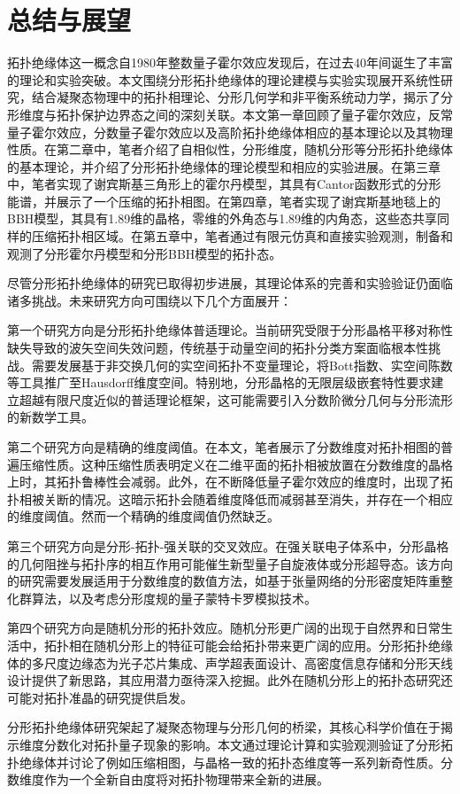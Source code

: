 \chapter{总结与展望}
拓扑绝缘体这一概念自1980年整数量子霍尔效应发现后，在过去40年间诞生了丰富的理论和实验突破。本文围绕分形拓扑绝缘体的理论建模与实验实现展开系统性研究，结合凝聚态物理中的拓扑相理论、分形几何学和非平衡系统动力学，揭示了分形维度与拓扑保护边界态之间的深刻关联。本文第一章回顾了量子霍尔效应，反常量子霍尔效应，分数量子霍尔效应以及高阶拓扑绝缘体相应的基本理论以及其物理性质。在第二章中，笔者介绍了自相似性，分形维度，随机分形等分形拓扑绝缘体的基本理论，并介绍了分形拓扑绝缘体的理论模型和相应的实验进展。在第三章中，笔者实现了谢宾斯基三角形上的霍尔丹模型，其具有Cantor函数形式的分形能谱，并展示了一个压缩的拓扑相图。在第四章，笔者实现了谢宾斯基地毯上的BBH模型，其具有1.89维的晶格，零维的外角态与1.89维的内角态，这些态共享同样的压缩拓扑相区域。在第五章中，笔者通过有限元仿真和直接实验观测，制备和观测了分形霍尔丹模型和分形BBH模型的拓扑态。

尽管分形拓扑绝缘体的研究已取得初步进展，其理论体系的完善和实验验证仍面临诸多挑战。未来研究方向可围绕以下几个方面展开：

第一个研究方向是分形拓扑绝缘体普适理论。当前研究受限于分形晶格平移对称性缺失导致的波矢空间失效问题，传统基于动量空间的拓扑分类方案面临根本性挑战。需要发展基于非交换几何的实空间拓扑不变量理论，将Bott指数、实空间陈数等工具推广至Hausdorff维度空间。特别地，分形晶格的无限层级嵌套特性要求建立超越有限尺度近似的普适理论框架，这可能需要引入分数阶微分几何与分形流形的新数学工具。

第二个研究方向是精确的维度阈值。在本文，笔者展示了分数维度对拓扑相图的普遍压缩性质。这种压缩性质表明定义在二维平面的拓扑相被放置在分数维度的晶格上时，其拓扑鲁棒性会减弱。此外，在不断降低量子霍尔效应的维度时，出现了拓扑相被关断的情况。这暗示拓扑会随着维度降低而减弱甚至消失，并存在一个相应的维度阈值。然而一个精确的维度阈值仍然缺乏。

第三个研究方向是分形-拓扑-强关联的交叉效应。在强关联电子体系中，分形晶格的几何阻挫与拓扑序的相互作用可能催生新型量子自旋液体或分形超导态。该方向的研究需要发展适用于分数维度的数值方法，如基于张量网络的分形密度矩阵重整化群算法，以及考虑分形度规的量子蒙特卡罗模拟技术。

第四个研究方向是随机分形的拓扑效应。随机分形更广阔的出现于自然界和日常生活中，拓扑相在随机分形上的特征可能会给拓扑带来更广阔的应用。分形拓扑绝缘体的多尺度边缘态为光子芯片集成、声学超表面设计、高密度信息存储和分形天线设计提供了新思路，其应用潜力亟待深入挖掘。此外在随机分形上的拓扑态研究还可能对拓扑准晶的研究提供启发。

分形拓扑绝缘体研究架起了凝聚态物理与分形几何的桥梁，其核心科学价值在于揭示维度分数化对拓扑量子现象的影响。本文通过理论计算和实验观测验证了分形拓扑绝缘体并讨论了例如压缩相图，与晶格一致的拓扑态维度等一系列新奇性质。分数维度作为一个全新自由度将对拓扑物理带来全新的进展。